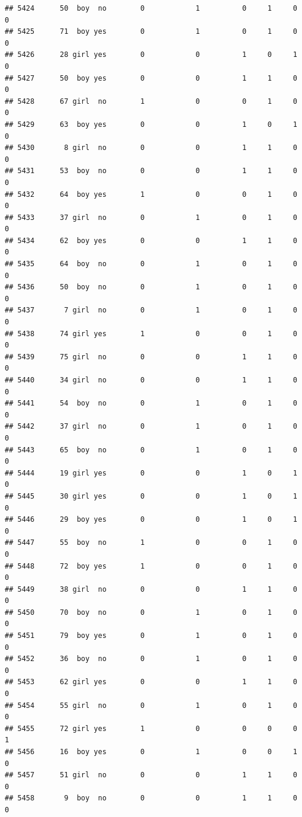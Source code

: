 \documentclass[man]{apa6}
\begin{document}
\begin{verbatim}
## 5424      50  boy  no        0            1          0     1     0     0
## 5425      71  boy yes        0            1          0     1     0     0
## 5426      28 girl yes        0            0          1     0     1     0
## 5427      50  boy yes        0            0          1     1     0     0
## 5428      67 girl  no        1            0          0     1     0     0
## 5429      63  boy yes        0            0          1     0     1     0
## 5430       8 girl  no        0            0          1     1     0     0
## 5431      53  boy  no        0            0          1     1     0     0
## 5432      64  boy yes        1            0          0     1     0     0
## 5433      37 girl  no        0            1          0     1     0     0
## 5434      62  boy yes        0            0          1     1     0     0
## 5435      64  boy  no        0            1          0     1     0     0
## 5436      50  boy  no        0            1          0     1     0     0
## 5437       7 girl  no        0            1          0     1     0     0
## 5438      74 girl yes        1            0          0     1     0     0
## 5439      75 girl  no        0            0          1     1     0     0
## 5440      34 girl  no        0            0          1     1     0     0
## 5441      54  boy  no        0            1          0     1     0     0
## 5442      37 girl  no        0            1          0     1     0     0
## 5443      65  boy  no        0            1          0     1     0     0
## 5444      19 girl yes        0            0          1     0     1     0
## 5445      30 girl yes        0            0          1     0     1     0
## 5446      29  boy yes        0            0          1     0     1     0
## 5447      55  boy  no        1            0          0     1     0     0
## 5448      72  boy yes        1            0          0     1     0     0
## 5449      38 girl  no        0            0          1     1     0     0
## 5450      70  boy  no        0            1          0     1     0     0
## 5451      79  boy yes        0            1          0     1     0     0
## 5452      36  boy  no        0            1          0     1     0     0
## 5453      62 girl yes        0            0          1     1     0     0
## 5454      55 girl  no        0            1          0     1     0     0
## 5455      72 girl yes        1            0          0     0     0     1
## 5456      16  boy yes        0            1          0     0     1     0
## 5457      51 girl  no        0            0          1     1     0     0
## 5458       9  boy  no        0            0          1     1     0     0

\end{verbatim}
\end{document}
